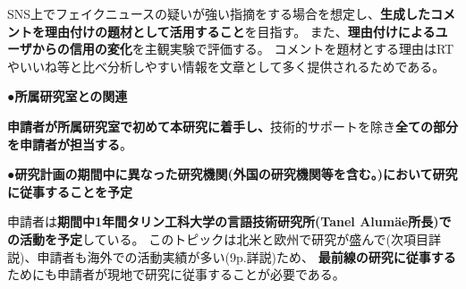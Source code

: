 {	SNS上でフェイクニュースの疑いが強い指摘をする場合を想定し、\textbf{生成したコメントを理由付けの題材として活用すること}を目指す。
	また、\textbf{理由付けによるユーザからの信用の変化}を主観実験で評価する。
	コメントを題材とする理由はRTやいいね等と比べ分析しやすい情報を文章として多く提供されるためである。

	\noindent
	●\textbf{所属研究室との関連}

	\textbf{申請者が所属研究室で初めて本研究に着手し、}技術的サポートを除き\textbf{全ての部分を申請者が担当する}。

	\noindent
	●\textbf{研究計画の期間中に異なった研究機関(外国の研究機関等を含む。)において研究に従事することを予定}
	
	申請者は\textbf{期間中1年間タリン工科大学の言語技術研究所(Tanel Alumäe所長)での活動を予定}している。
	このトピックは北米と欧州で研究が盛んで(次項目詳説)、申請者も海外での活動実績が多い(9p.詳説)ため、
	\textbf{最前線の研究に従事する}ためにも申請者が現地で研究に従事することが必要である。

}

\newcommand{\人権の保護及び法令等の遵守への対応}{%
	コメント取得を予定してしているSNSはTwitterである。
	Twitter社は2020年3月より学術目的でTwitter APIの利用を自由化しているほか、
	取得したツイートIDを含む情報をデータセットとして公開することも学術目的であれば認められている\cite{twitter_2020}。

	また、先行研究が提供したデータセットを使用する場合は、提供者が示すライセンスやポリシーを遵守する。

	なお、学習済みモデルの公表は平成30年改正著作権法第30条4号により認められている。

	ただし、本研究では主観評価実験としてSNSユーザを対象としたアンケート調査を予定している。
	この調査により収集したデータは、個⼈の特定につながる情報を匿名化した上で解析を⾏い、
	解析結果の公表に際しては、匿名化を⾏ったデータを⽤い、個⼈情報の漏洩防⽌に配慮する。

	{\footnotesize
		\begin{thebibliography}{99}
			\setcounter{enumiv}{11}
			\bibitem{twitter_2020} Twitter開発者ポリシーを分かりやすくアップデート, 2020年3月11日. (最終閲覧日 2020年4月19日) \url{https://blog.twitter.com/developer/ja_jp/topics/tools/2020/DevPolicyUpdate.html}
		\end{thebibliography}
	}
}

